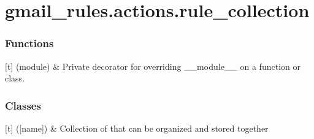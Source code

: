 \documentclass[letterpaper,10pt,english]{sphinxmanual}
\begin{document}
\sphinxstepscope


\section{gmail\_rules.actions.rule\_collection}
\label{\detokenize{_autosummary/gmail_rules.actions.rule_collection:module-gmail_rules.actions.rule_collection}}\label{\detokenize{_autosummary/gmail_rules.actions.rule_collection:gmail-rules-actions-rule-collection}}\label{\detokenize{_autosummary/gmail_rules.actions.rule_collection::doc}}\subsubsection*{Functions}


\begin{savenotes}\sphinxattablestart
\sphinxthistablewithglobalstyle
\sphinxthistablewithnovlinesstyle
\centering
\begin{tabulary}{\linewidth}[t]{}
\sphinxtoprule
\sphinxtableatstartofbodyhook
\sphinxAtStartPar
{}(module)
&
\sphinxAtStartPar
Private decorator for overriding \_\_module\_\_ on a function or class.
\\
\sphinxbottomrule
\end{tabulary}
\sphinxtableafterendhook\par
\sphinxattableend\end{savenotes}
\subsubsection*{Classes}


\begin{savenotes}\sphinxattablestart
\sphinxthistablewithglobalstyle
\sphinxthistablewithnovlinesstyle
\centering
\begin{tabulary}{\linewidth}[t]{}
\sphinxtoprule
\sphinxtableatstartofbodyhook
\sphinxAtStartPar
{\hyperref[\detokenize{_autosummary/gmail_rules.actions.rule_collection:gmail_rules.actions.rule_collection.Rule_Collection}]{}}({[}name{]})
&
\sphinxAtStartPar
Collection of  that can be organized and stored together
\\
\sphinxbottomrule
\end{tabulary}
\sphinxtableafterendhook\par
\sphinxattableend\end{savenotes}
\end{document}
